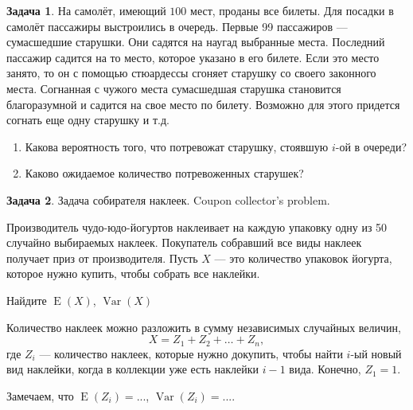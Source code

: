 \documentclass[nobib]{tufte-handout}
\theoremstyle{definition}
\newtheorem{problem}{Задача}
\DeclareMathOperator{\Var}{Var}
\DeclareMathOperator{\E}{E}
\begin{document}
\begin{problem}
На самолёт, имеющий $100$ мест, проданы все билеты. Для посадки в
самолёт пассажиры выстроились в очередь. Первые 99 пассажиров — сумасшедшие старушки. Они садятся
на наугад выбранные места. Последний пассажир садится на то место,
которое указано в его билете. Если это место занято, то он с
помощью стюардессы сгоняет старушку со своего законного места.
Согнанная с чужого места сумасшедшая старушка становится
благоразумной и садится на свое место по билету. Возможно для
этого придется согнать еще одну старушку и т.д.
\begin{enumerate}
\item Какова вероятность того, что потревожат старушку, стоявшую $i$-ой в очереди?
\item Каково ожидаемое количество потревоженных старушек?
\end{enumerate}

\begin{sol}
\end{sol}

\end{problem}


\begin{problem}
Задача собирателя наклеек. Coupon collector's problem.

Производитель чудо-юдо-йогуртов наклеивает на каждую упаковку одну из 50 случайно выбираемых наклеек. Покупатель собравший все виды наклеек получает приз от производителя. Пусть $X$ — это количество упаковок йогурта, которое нужно купить, чтобы собрать все наклейки.

Найдите  $\E(X)$, $\Var(X)$

\begin{sol}
Количество наклеек можно разложить в сумму независимых случайных величин,
\[
X=Z_1+Z_2+\ldots+Z_n,
\]
где $Z_i$ — количество наклеек, которые нужно докупить, чтобы найти $i$-ый новый вид наклейки, когда в коллекции уже есть наклейки $i-1$ вида. Конечно, $Z_1=1$.

Замечаем, что $\E(Z_i)=...$, $\Var(Z_i)=...$.
\end{sol}

\end{problem}
\end{document}
